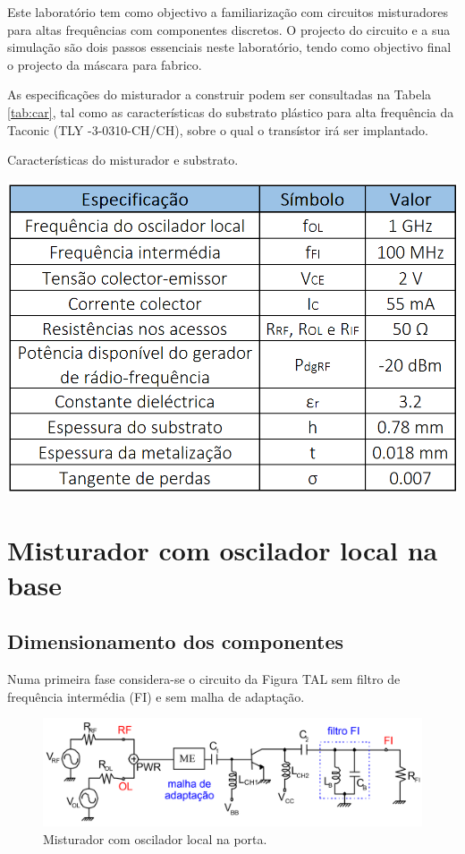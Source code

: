 \documentclass[11pt]{article}
\numberwithin{equation}{section}
\begin{document}
Este laboratório tem como objectivo a familiarização com circuitos misturadores para altas frequências com componentes discretos. O projecto do circuito e a sua simulação são dois passos essenciais neste laboratório, tendo como objectivo final o projecto da máscara para fabrico.

As especificações do misturador a construir podem ser consultadas na Tabela \ref{tab:car}, tal como as características do substrato plástico para alta frequência da Taconic (TLY -3-0310-CH/CH), sobre o qual o transístor irá ser implantado. 

\begin{table}[h]
\centering
\caption{Características do misturador e substrato.}
\vspace{-1.5mm}
\includegraphics[keepaspectratio=true, scale=0.35]{teoricas/table1}
\label{tab:car}
\end{table}

\section{Misturador com oscilador local na base}

\subsection{Dimensionamento dos componentes}

Numa primeira fase considera-se o circuito da Figura TAL sem filtro de frequência intermédia (FI) e sem malha de adaptação.

\begin{figure}[h]
\centering
\includegraphics[keepaspectratio=true, scale=0.30]{teoricas/circuitoOriginal}
\vspace{-0.5em}
\caption{Misturador com oscilador local na porta.}
\vspace{-0.8em}
\end{figure}
\end{document}
